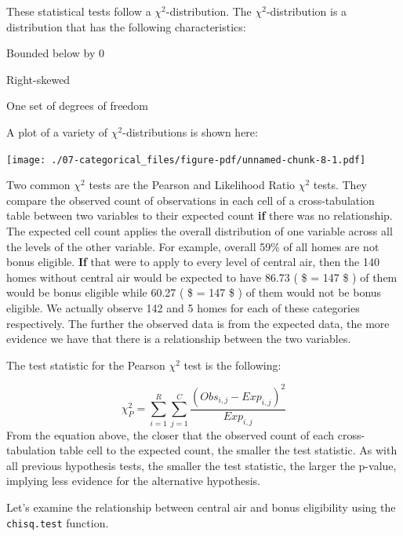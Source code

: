 \documentclass[
  letterpaper,
  DIV=11,
  numbers=noendperiod]{scrreprt}
\newenvironment{Shaded}{\begin{snugshade}}{\end{snugshade}}
\newcommand{\FunctionTok}[1]{\textcolor[rgb]{0.28,0.35,0.67}{#1}}
\newcommand{\NormalTok}[1]{\textcolor[rgb]{0.00,0.23,0.31}{#1}}
\newcommand{\SpecialCharTok}[1]{\textcolor[rgb]{0.37,0.37,0.37}{#1}}
\begin{document}
These statistical tests follow a \(\chi^2\)-distribution. The
\(\chi^2\)-distribution is a distribution that has the following
characteristics:

Bounded below by 0

Right-skewed

One set of degrees of freedom

A plot of a variety of \(\chi^2\)-distributions is shown here:

\texttt{[image: ./07-categorical\_files/figure-pdf/unnamed-chunk-8-1.pdf]}

Two common \(\chi^2\) tests are the Pearson and Likelihood Ratio
\(\chi^2\) tests. They compare the observed count of observations in
each cell of a cross-tabulation table between two variables to their
expected count \textbf{if} there was no relationship. The expected cell
count applies the overall distribution of one variable across all the
levels of the other variable. For example, overall 59\% of all homes are
not bonus eligible. \textbf{If} that were to apply to every level of
central air, then the 140 homes without central air would be expected to
have 86.73 ( \$ = 147  \$ ) of them would be bonus eligible
while 60.27 ( \$ = 147 \$ ) of them would not be bonus
eligible. We actually observe 142 and 5 homes for each of these
categories respectively. The further the observed data is from the
expected data, the more evidence we have that there is a relationship
between the two variables.

The test statistic for the Pearson \(\chi^2\) test is the following:

\[
\chi^2_P = \sum_{i=1}^R \sum_{j=1}^C \frac{(Obs_{i,j} - Exp_{i,j})^2}{Exp_{i,j}}
\] From the equation above, the closer that the observed count of each
cross-tabulation table cell to the expected count, the smaller the test
statistic. As with all previous hypothesis tests, the smaller the test
statistic, the larger the p-value, implying less evidence for the
alternative hypothesis.

Let's examine the relationship between central air and bonus eligibility
using the \texttt{chisq.test} function.

\begin{Shaded}
\end{Shaded}
\end{document}

